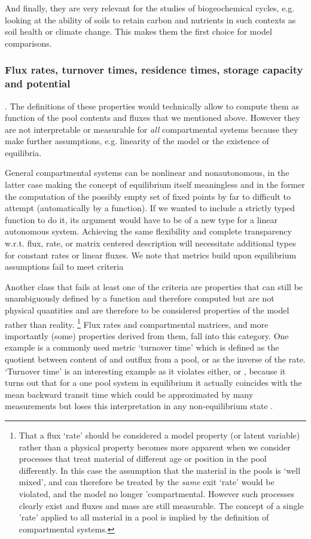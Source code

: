 And finally, they are very relevant for the studies of biogeochemical cycles, e.g. looking at the ability of soils to retain carbon and nutrients in such contexts as soil health or climate change. 
This makes them the first choice for model comparisons. 

\subsubsection{Flux rates, turnover times, residence times, storage capacity and potential}.
The definitions of these properties would technically allow to compute them as function of the pool contents and fluxes that 
we mentioned above.
However they are not interpretable or measurable for \emph{all} compartmental systems because they make further assumptions, e.g. linearity of the model or the existence of equilibria. 

General compartmental systems can be nonlinear and nonautonomous, in the latter case making the concept of equilibrium itself meaningless and in the former the computation of the possibly empty set of fixed points by far to difficult to attempt (automatically by a function).
If we wanted to include a strictly typed function to do it, its argument would
have to be of a new type for a linear autonomous system.  Achieving the same flexibility
and complete transparency w.r.t. flux, rate, or matrix centered description
will necessitate additional types for constant rates or linear fluxes.
We note that metrics build upon equilibrium assumptions fail to meet criteria 

Another class that fails at least one of the criteria
are properties that can still be unambiguously defined by a function and
therefore computed but are not physical quantities and are therefore to be
considered properties of the model rather than reality. 
\footnote{
  That a flux `rate' should be considered a model property (or latent variable)
  rather than a physical property becomes more apparent when we consider
  processes that treat material of different age or position in the pool
  differently.  In this case the assumption that the material in the pools is
  `well mixed', and can therefore be treated by the \emph{same} exit `rate'
  would be violated, and the model no longer 'compartmental.  However such
  processes clearly exist and fluxes and mass are still measurable.  The
  concept of a single 'rate' applied to all material in a pool is implied by
  the definition of compartmental systems.
} 
Flux rates and compartmental matrices, and more importantly (some) properties derived from them, fall into  this category. 
One example is a commonly used metric `turnover time' which is defined as the quotient between content of and outflux from a pool, or as the inverse of the rate. 
`Turnover time' is an interesting example as it violates either,  or , 
because it turns out that for a one pool system in equilibrium it actually coincides with the mean backward transit time
which could be approximated by many measurements but loses this interpretation in any non-equilibrium state \cite{Sierra2016GlobChangBiol, Lu2018Biogeosciences}.

